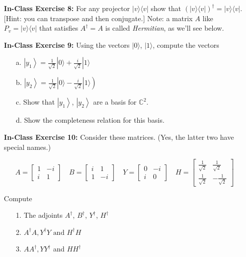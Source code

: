 \documentclass[main.tex]{subfiles}
\begin{document}
\begin{enumerate}
\item[] \textbf{In-Class Exercise 8:} For any projector $|v\rangle\langle v|$ show that $(|v\rangle\langle v|)^{\dagger}=|v\rangle\langle v|$. [Hint: you can transpose and then conjugate.] Note: a matrix $A$ like $P_{v}=|v\rangle\langle v|$ that satisfies $A^{\dagger}=A$ is called \emph{Hermitian}, as we'll see below.

\item[] \textbf{In-Class Exercise 9:} Using the vectors $|0\rangle$, $|1\rangle$, compute the vectors

    \begin{enumerate}
        \item[a.] $\left|y_{1}\right\rangle=\frac{1}{\sqrt{2}}|0\rangle+\frac{i}{\sqrt{2}}|1\rangle$
        \item[b.] $\left.\left|y_{2}\right\rangle=\frac{1}{\sqrt{2}}|0\rangle-\frac{i}{\sqrt{2}}|1\rangle\right)$
        \item[c.] Show that $\left|y_{1}\right\rangle$, $\left|y_{2}\right\rangle$ are a basis for $\mathbb{C}^{2}$.
        \item[d.] Show the completeness relation for this basis.
    \end{enumerate}

\item[] \textbf{In-Class Exercise 10:} Consider these matrices. (Yes, the latter two have special names.)

    $$
    A=\left[\begin{array}{cc}
    1 & -i \\
    i & 1
    \end{array}\right] \quad B=\left[\begin{array}{cc}
    i & 1 \\
    1 & -i
    \end{array}\right] \quad Y=\left[\begin{array}{cc}
    0 & -i \\
    i & 0
    \end{array}\right] \quad H=\left[\begin{array}{cc}
    \frac{1}{\sqrt{2}} & \frac{1}{\sqrt{2}} \\
    \frac{1}{\sqrt{2}} & -\frac{1}{\sqrt{2}}
    \end{array}\right]
    $$
    
    Compute
    
    \begin{enumerate}
        \item[1.] The adjoints $A^{\dagger}$, $B^{\dagger}$, $Y^{\dagger}$, $H^{\dagger}$
        \item[2.] $A^{\dagger} A, Y^{\dagger} Y \text{ and } H^{\dagger} H$
        \item[3.] $A A^{\dagger}, Y Y^{\dagger}$ and $H H^{\dagger}$
    \end{enumerate}
    

\end{enumerate}
\end{document}
